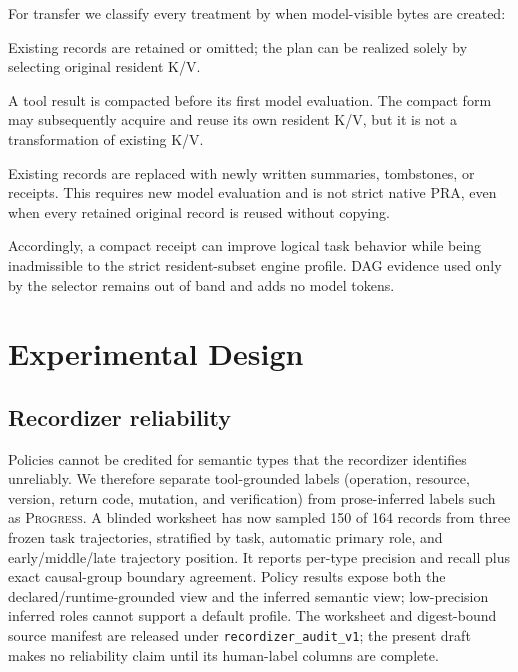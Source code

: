 \documentclass[11pt]{article}
\begin{document}
For transfer we classify every treatment by when model-visible bytes are
created:
\begin{description}[leftmargin=!,labelwidth=3.4cm]
    \item[Selection-only.] Existing records are retained or omitted; the plan
    can be realized solely by selecting original resident K/V.
    \item[Ingest-time transform.] A tool result is compacted before its first
    model evaluation.  The compact form may subsequently acquire and reuse its
    own resident K/V, but it is not a transformation of existing K/V.
    \item[Post-cache transform.] Existing records are replaced with newly
    written summaries, tombstones, or receipts.  This requires new model
    evaluation and is not strict native PRA, even when every retained original
    record is reused without copying.
\end{description}
Accordingly, a compact receipt can improve logical task behavior while being
inadmissible to the strict resident-subset engine profile.  DAG evidence used
only by the selector remains out of band and adds no model tokens.

\section{Experimental Design}

\subsection{Recordizer reliability}

Policies cannot be credited for semantic types that the recordizer identifies
unreliably. We therefore separate tool-grounded labels (operation, resource,
version, return code, mutation, and verification) from prose-inferred labels
such as \textsc{Progress}. A blinded worksheet has now sampled 150 of 164
records from three frozen task trajectories, stratified by task, automatic
primary role, and early/middle/late trajectory position. It reports
per-type precision and recall plus exact causal-group boundary agreement.
Policy results expose both the declared/runtime-grounded view and the inferred
semantic view; low-precision inferred roles cannot support a default profile.
The worksheet and digest-bound source manifest are released under
\texttt{recordizer\_audit\_v1}; the present draft makes no reliability claim
until its human-label columns are complete.
\end{document}

